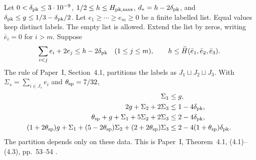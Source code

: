 \begin{fact}\label{fact:packing}
Let $0<\delta_{\rm pk}\le3\cdot10^{-9}$,
$1/2\le h\le H_{\rm pk,max}$, $d_*=h-2\delta_{\rm pk}$, and
$\delta_{\rm pk}\le g\le1/3-\delta_{\rm pk}/2$.
Let $e_1\ge\cdots\ge e_m\ge0$ be a finite labelled list.
Equal values keep distinct labels. The empty list is allowed.
Extend the list by zeros, writing $\bar e_i=0$ for $i>m$.
Suppose
\begin{equation}\label{eq:classical-packing-hypotheses}
 \sum_{i<j}e_i+2e_j\le h-2\delta_{\rm pk}\quad(1\le j\le m),\qquad
 h\le\widetilde H(\bar e_1,\bar e_2,\bar e_3).
\end{equation}
The rule of Paper~I, Section~4.1, partitions the labels as
$J_1\sqcup J_2\sqcup J_3$. With
$\Sigma_s=\sum_{i\in J_s}e_i$ and $\theta_{\rm sp}=7/32$,
\begin{equation}\label{eq:classical-packing-loads}
 \begin{aligned}
 \Sigma_1&\le g,\\
 2g+\Sigma_2+2\Sigma_3&\le1-4\delta_{\rm pk},\\
 \theta_{\rm sp}+g+\Sigma_1+5\Sigma_2+2\Sigma_3&\le2-4\delta_{\rm pk},\\
 (1+2\theta_{\rm sp})g+\Sigma_1+
 (5-2\theta_{\rm sp})\Sigma_2+
 (2+2\theta_{\rm sp})\Sigma_3
 &\le2-4(1+\theta_{\rm sp})\delta_{\rm pk}.
 \end{aligned}
\end{equation}
The partition depends only on these data.
This is Paper~I, Theorem~4.1, (4.1)--(4.3), pp.~53--54
\cite[Theorem~4.1, (4.1)--(4.3), pp.~53--54]{PaperI}.
\end{fact}


